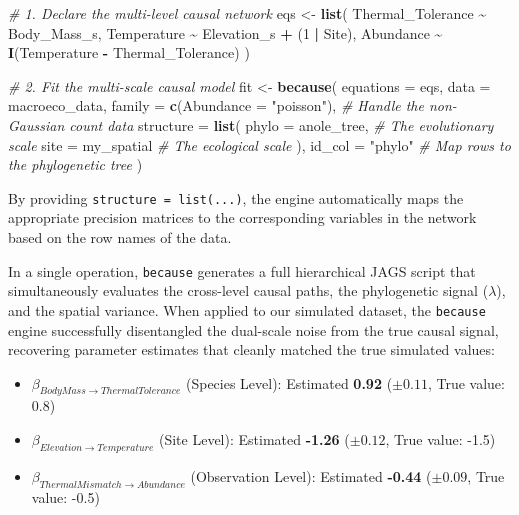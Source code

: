 \documentclass[
]{article}
\newenvironment{Shaded}{\begin{snugshade}}{\end{snugshade}}
\newcommand{\AttributeTok}[1]{\textcolor[rgb]{0.13,0.29,0.53}{#1}}
\newcommand{\CommentTok}[1]{\textcolor[rgb]{0.56,0.35,0.01}{\textit{#1}}}
\newcommand{\DecValTok}[1]{\textcolor[rgb]{0.00,0.00,0.81}{#1}}
\newcommand{\FunctionTok}[1]{\textcolor[rgb]{0.13,0.29,0.53}{\textbf{#1}}}
\newcommand{\NormalTok}[1]{#1}
\newcommand{\OtherTok}[1]{\textcolor[rgb]{0.56,0.35,0.01}{#1}}
\newcommand{\SpecialCharTok}[1]{\textcolor[rgb]{0.81,0.36,0.00}{\textbf{#1}}}
\newcommand{\StringTok}[1]{\textcolor[rgb]{0.31,0.60,0.02}{#1}}
\providecommand{\tightlist}{%
  \setlength{\itemsep}{0pt}\setlength{\parskip}{0pt}}
\begin{document}
\begin{Shaded}
\begin{Highlighting}[]
\CommentTok{\# 1. Declare the multi{-}level causal network}
\NormalTok{eqs }\OtherTok{\textless{}{-}} \FunctionTok{list}\NormalTok{(}
\NormalTok{    Thermal\_Tolerance }\SpecialCharTok{\textasciitilde{}}\NormalTok{ Body\_Mass\_s,}
\NormalTok{    Temperature }\SpecialCharTok{\textasciitilde{}}\NormalTok{ Elevation\_s }\SpecialCharTok{+}\NormalTok{ (}\DecValTok{1} \SpecialCharTok{|}\NormalTok{ Site),}
\NormalTok{    Abundance }\SpecialCharTok{\textasciitilde{}} \FunctionTok{I}\NormalTok{(Temperature }\SpecialCharTok{{-}}\NormalTok{ Thermal\_Tolerance)}
\NormalTok{)}

\CommentTok{\# 2. Fit the multi{-}scale causal model}
\NormalTok{fit }\OtherTok{\textless{}{-}} \FunctionTok{because}\NormalTok{(}
    \AttributeTok{equations =}\NormalTok{ eqs,}
    \AttributeTok{data =}\NormalTok{ macroeco\_data,}
    \AttributeTok{family =} \FunctionTok{c}\NormalTok{(}\AttributeTok{Abundance =} \StringTok{"poisson"}\NormalTok{), }\CommentTok{\# Handle the non{-}Gaussian count data}
    \AttributeTok{structure =} \FunctionTok{list}\NormalTok{(}
        \AttributeTok{phylo =}\NormalTok{ anole\_tree,            }\CommentTok{\# The evolutionary scale}
        \AttributeTok{site =}\NormalTok{ my\_spatial              }\CommentTok{\# The ecological scale}
\NormalTok{    ),}
    \AttributeTok{id\_col =} \StringTok{"phylo"}                   \CommentTok{\# Map rows to the phylogenetic tree}
\NormalTok{)}
\end{Highlighting}
\end{Shaded}

By providing \texttt{structure\ =\ list(...)}, the engine automatically maps the appropriate precision matrices to the corresponding variables in the network based on the row names of the data.

In a single operation, \texttt{because} generates a full hierarchical JAGS script that simultaneously evaluates the cross-level causal paths, the phylogenetic signal (\(\lambda\)), and the spatial variance. When applied to our simulated dataset, the \texttt{because} engine successfully disentangled the dual-scale noise from the true causal signal, recovering parameter estimates that cleanly matched the true simulated values:

\begin{itemize}
\tightlist
\item
  \(\beta_{Body Mass \rightarrow Thermal Tolerance}\) (Species Level): Estimated \textbf{0.92} (\(\pm 0.11\), True value: 0.8)
\item
  \(\beta_{Elevation \rightarrow Temperature}\) (Site Level): Estimated \textbf{-1.26} (\(\pm 0.12\), True value: -1.5)
\item
  \(\beta_{Thermal Mismatch \rightarrow Abundance}\) (Observation Level): Estimated \textbf{-0.44} (\(\pm 0.09\), True value: -0.5)
\end{itemize}
\end{document}
